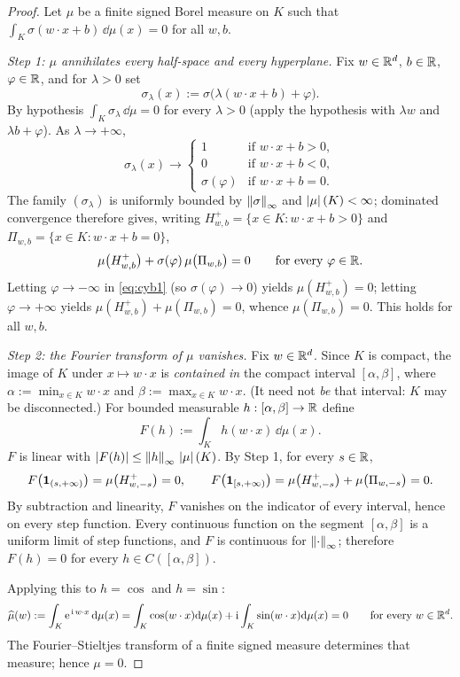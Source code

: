 \documentclass[11pt,a4paper]{article}
\begin{document}
\begin{proof}
Let $\mu$ be a finite signed Borel measure on $K$ such that
$\int_K \sigma(w\cdot x + b)\,\dd\mu(x) = 0$ for all $w, b$.

\smallskip
\noindent\emph{Step 1: $\mu$ annihilates every half-space and every hyperplane.}
Fix $w \in \mathbb{R}^d$, $b \in \mathbb{R}$, $\varphi \in \mathbb{R}$, and for $\lambda > 0$ set
\[
\sigma_\lambda(x) := \sigma\big(\lambda(w\cdot x + b) + \varphi\big).
\]
By hypothesis $\int_K \sigma_\lambda \,\dd\mu = 0$ for every $\lambda > 0$ (apply the hypothesis
with $\lambda w$ and $\lambda b + \varphi$). As $\lambda \to +\infty$,
\[
\sigma_\lambda(x) \longrightarrow
\begin{cases}
1 & \text{if } w\cdot x + b > 0,\\
0 & \text{if } w\cdot x + b < 0,\\
\sigma(\varphi) & \text{if } w\cdot x + b = 0.
\end{cases}
\]
The family $(\sigma_\lambda)$ is uniformly bounded by $\left\lVert \sigma \right\rVert_\infty$ and
$\left\lvert \mu \right\rvert(K) < \infty$; dominated convergence therefore gives, writing
$H^+_{w,b} = \{x \in K : w\cdot x + b > 0\}$ and $\Pi_{w,b} = \{x \in K : w\cdot x + b = 0\}$,
\begin{equation}\label{eq:cyb1}
\mu\big(H^+_{w,b}\big) + \sigma(\varphi)\, \mu\big(\Pi_{w,b}\big) = 0
\qquad \text{for every } \varphi \in \mathbb{R} .
\end{equation}
Letting $\varphi \to -\infty$ in \eqref{eq:cyb1} (so $\sigma(\varphi) \to 0$) yields
$\mu(H^+_{w,b}) = 0$; letting $\varphi \to +\infty$ yields
$\mu(H^+_{w,b}) + \mu(\Pi_{w,b}) = 0$, whence $\mu(\Pi_{w,b}) = 0$. This holds for all $w, b$.

\smallskip
\noindent\emph{Step 2: the Fourier transform of $\mu$ vanishes.}
Fix $w \in \mathbb{R}^d$. Since $K$ is compact, the image of $K$ under $x \mapsto w\cdot x$ is
\emph{contained in} the compact interval $[\alpha,\beta]$, where
$\alpha := \min_{x \in K} w\cdot x$ and $\beta := \max_{x \in K} w\cdot x$. (It need not \emph{be}
that interval: $K$ may be disconnected.) For bounded measurable $h : [\alpha,\beta] \to \mathbb{R}$ define
\[
F(h) := \int_K h(w\cdot x)\, \dd \mu(x) .
\]
$F$ is linear with $\left\lvert F(h) \right\rvert \le \left\lVert h \right\rVert_\infty\, \left\lvert \mu \right\rvert(K)$. By Step 1, for every $s \in \mathbb{R}$,
\[
F\big(\mathbf{1}_{(s,+\infty)}\big) = \mu\big(H^+_{w,-s}\big) = 0,
\qquad
F\big(\mathbf{1}_{[s,+\infty)}\big) = \mu\big(H^+_{w,-s}\big) + \mu\big(\Pi_{w,-s}\big) = 0 .
\]
By subtraction and linearity, $F$ vanishes on the indicator of every interval, hence on every step
function. Every continuous function on the segment $[\alpha,\beta]$ is a uniform limit of step
functions, and $F$ is continuous for $\left\lVert \cdot \right\rVert_\infty$; therefore $F(h) = 0$ for every
$h \in C([\alpha,\beta])$.

Applying this to $h = \cos$ and $h = \sin$:
\[
\widehat{\mu}(w) := \int_K \mathrm{e}^{\,\mathrm{i}\, w \cdot x}\, \mathrm{d}\mu(x)
= \int_K \cos(w\cdot x)\mathrm{d}\mu(x) + \mathrm{i} \int_K \sin(w\cdot x)\mathrm{d}\mu(x) = 0
\qquad \text{for every } w \in \mathbb{R}^d .
\]
The Fourier--Stieltjes transform of a finite signed measure determines that measure; hence
$\mu = 0$.
\end{proof}
\end{document}
